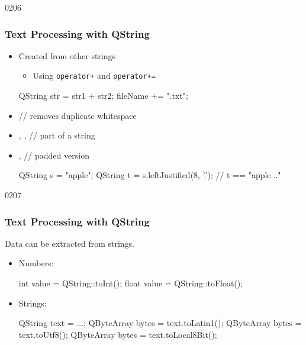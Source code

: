 \begin{slide}[fragile]{0206}\frametitle{Text Processing with QString}
  \begin{itemize}
  \item Created from other strings
    \begin{itemize}
    \item Using \texttt{operator+} and \texttt{operator+=}    
    \end{itemize}
 \begin{cpp}    
QString str = str1 + str2;
fileName += ".txt";
  \end{cpp}
 \item {} // removes duplicate whitespace
 \item{}, ,
    // part of a string
  \item {},
     // padded version
 \begin{cpp}
QString s = "apple";
QString t = s.leftJustified(8, '.'); // t == "apple..."
  \end{cpp}
  \end{itemize}
\end{slide}

\begin{slide}[fragile]{0207}\frametitle{Text Processing with QString}
  Data can be extracted from strings.
  \vspace*{1em}
  
  \begin{itemize}
  \item Numbers:
 \begin{cpp}
int value = QString::toInt();
float value = QString::toFloat();
  \end{cpp}
 \item Strings:
 \begin{cpp}
QString text = ...;
QByteArray bytes = text.toLatin1();
QByteArray bytes = text.toUtf8();
QByteArray bytes = text.toLocal8Bit();
  \end{cpp}
  \end{itemize}
\end{slide}


